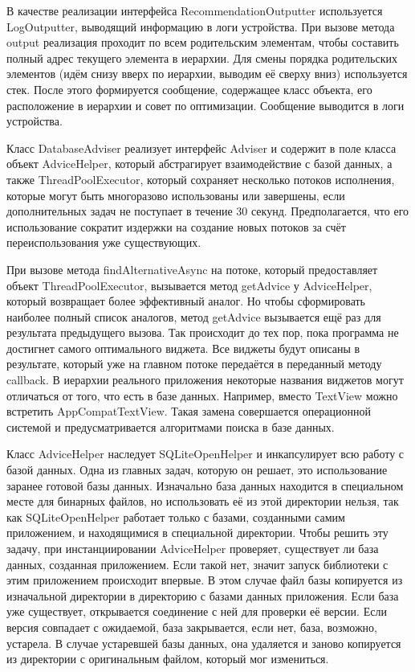 \documentclass[a4paper,14pt]{extarticle} %
\begin{document}
	В качестве реализации интерфейса RecommendationOutputter используется LogOutputter, выводящий информацию в логи устройства. При вызове метода output реализация проходит по всем родительским элементам, чтобы составить полный адрес текущего элемента в иерархии. Для смены порядка родительских элементов (идём снизу вверх по иерархии, выводим её сверху вниз) используется стек. После этого формируется сообщение, содержащее класс объекта, его расположение в иерархии и совет по оптимизации. Сообщение выводится в логи устройства.
	
	Класс DatabaseAdviser реализует интерфейс Adviser и содержит в поле класса объект AdviceHelper, который абстрагирует взаимодействие с базой данных, а также ThreadPoolExecutor, который сохраняет несколько потоков исполнения, которые могут быть многоразово использованы или завершены, если дополнительных задач не поступает в течение 30 секунд. Предполагается, что его использование сократит издержки на создание новых потоков за счёт переиспользования уже существующих. 
	
	При вызове метода findAlternativeAsync на потоке, который предоставляет объект ThreadPoolExecutor, вызывается метод getAdvice у AdviceHelper, который возвращает более эффективный аналог. Но чтобы сформировать наиболее полный список аналогов, метод getAdvice вызывается ещё раз для результата предыдущего вызова. Так происходит до тех пор, пока программа не достигнет самого оптимального виджета. Все виджеты будут описаны в результате, который уже на главном потоке передаётся в переданный методу callback. В иерархии реального приложения некоторые названия виджетов могут отличаться от того, что есть в базе данных. Например, вместо TextView можно встретить AppCompatTextView. Такая замена совершается операционной системой и предусматривается алгоритмами поиска в базе данных.
	
	Класс AdviceHelper наследует SQLiteOpenHelper и инкапсулирует всю работу с базой данных. Одна из главных задач, которую он решает, это использование заранее готовой базы данных. Изначально база данных находится в специальном месте для бинарных файлов, но использовать её из этой директории нельзя, так как SQLiteOpenHelper работает только с базами, созданными самим приложением, и находящимися в специальной директории. Чтобы решить эту задачу, при инстанциировании AdviceHelper проверяет, существует ли база данных, созданная приложением. Если такой нет, значит запуск библиотеки с этим приложением происходит впервые. В этом случае файл базы копируется из изначальной директории в директорию с базами данных приложения. Если база уже существует, открывается соединение с ней для проверки её версии. Если версия совпадает с ожидаемой, база закрывается, если нет, база, возможно, устарела. В случае устаревшей базы данных, она удаляется и заново копируется из директории с оригинальным файлом, который мог измениться.
	
\end{document}
